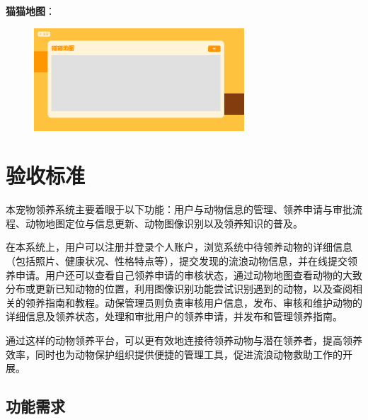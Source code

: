 \documentclass[12pt,a4paper,UTF8]{article}
\begin{document}
\noindent\textbf{猫猫地图}：

\begin{figure}[H]
  \centering
  \includegraphics[width=0.7\textwidth]{figures/UI4.png}
\end{figure}



\section{验收标准}

本宠物领养系统主要着眼于以下功能：用户与动物信息的管理、领养申请与审批流程、动物地图定位与信息更新、动物图像识别以及领养知识的普及。

在本系统上，用户可以注册并登录个人账户，浏览系统中待领养动物的详细信息（包括照片、健康状况、性格特点等），提交发现的流浪动物信息，并在线提交领养申请。用户还可以查看自己领养申请的审核状态，通过动物地图查看动物的大致分布或更新已知动物的位置，利用图像识别功能尝试识别遇到的动物，以及查阅相关的领养指南和教程。动保管理员则负责审核用户信息，发布、审核和维护动物的详细信息及领养状态，处理和审批用户的领养申请，并发布和管理领养指南。

通过这样的动物领养平台，可以更有效地连接待领养动物与潜在领养者，提高领养效率，同时也为动物保护组织提供便捷的管理工具，促进流浪动物救助工作的开展。

\subsection{功能需求}
\end{document}

